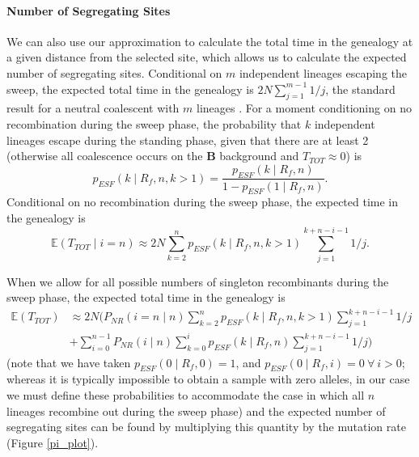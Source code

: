 \documentclass[a4paper,10pt]{article}
\begin{document}
\paragraph{Number of Segregating Sites}
We can also use our approximation to calculate the total time in the genealogy at a given distance from the selected site, which allows us to calculate the expected number of segregating sites. Conditional on $m$ independent lineages escaping the sweep, the expected total time in the genealogy is $2N \sum_{j=1}^{m-1} 1/j$, the standard result for a neutral coalescent with $m$ lineages \citep{Watterson:1975ur}. For a moment conditioning on no recombination during the sweep phase, the probability that $k$ independent lineages escape during the standing phase, given that there are at least 2 (otherwise all coalescence occurs on the $\textbf{B}$ background and $T_{TOT} \approx 0$) is 
\begin{equation}
	p_{ESF}\left(k \mid R_f , n , k > 1\right) = \frac{p_{ESF}\left(k \mid R_f , n \right)}{1 - p_{ESF}\left(1 \mid R_f , n \right)}.
\end{equation}
Conditional on no recombination during the sweep phase, the expected time in the genealogy is
\begin{equation}
	\mathbb{E}\left(T_{TOT} \mid i = n \right)  \approx 2N \sum_{k=2}^n p_{ESF}(k\mid R_f,n, k>1)   \sum_{j=1}^{k+n-i-1} 1/j.
\end{equation}

When we allow for all possible numbers of singleton recombinants during the sweep phase, the expected total time in the genealogy is
\begin{equation}
	\begin{aligned}
		\mathbb{E}(T_{TOT})  	&\approx 2N \biggl( P_{NR}(i=n\mid  n)  \sum_{k=2}^n p_{ESF}(k\mid R_f,n , k > 1)   \sum_{j=1}^{k+n-i-1} 1/j \\
							&+ \sum_{i=0}^{n-1} P_{NR} ( i \mid n) \sum_{k=0}^i p_{ESF}(k\mid R_f,n)   \sum_{j=1}^{k+n-i-1} 1/j\biggr)
	\end{aligned}
\end{equation}
(note that we have taken $p_{ESF}\left(0 \mid R_f,0\right)=1$, and $p_{ESF}\left(0 \mid R_f,i\right)=0\ \forall\ i > 0$; whereas it is typically impossible to obtain a sample with zero alleles, in our case we must define these probabilities to accommodate the case in which all $n$ lineages recombine out during the sweep phase)
and the expected number of segregating sites can be found by multiplying this quantity by the mutation rate (Figure \ref{pi_plot}).
\end{document}
